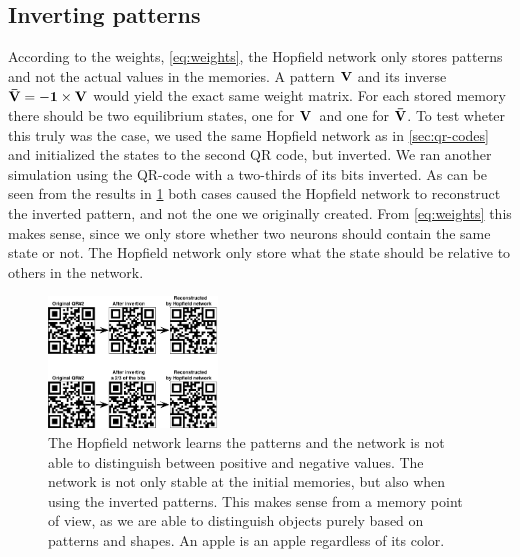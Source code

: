 \subsection{Inverting patterns}
According to the weights, \cref{eq:weights}, the Hopfield network only stores patterns and not the actual values in the memories. A pattern $\bf V$ and its inverse $\bf \bar{V} = -1 \times \bf V$ would yield the exact same weight matrix. For each stored memory there should be two equilibrium states, one for $\bf V$ and one for $\bf \bar{V}$. To test wheter this truly was the case, we used the same Hopfield network as in \cref{sec:qr-codes} and initialized the states to the second QR code, but inverted. We ran another simulation using the QR-code with a two-thirds of its bits inverted. As can be seen from the results in \cref{fig:inverted-qr} both cases caused the Hopfield network to reconstruct the inverted pattern, and not the one we originally created. From \cref{eq:weights} this makes sense, since we only store whether two neurons should contain the same state or not. The Hopfield network only store what the state should be relative to others in the network.
\begin{figure}[H]
    \centering
        \includegraphics[width=0.4\textwidth]{figs/qr-inverted}
        \caption{The Hopfield network learns the patterns and the network is not able to distinguish between positive and negative values. The network is not only stable at the initial memories, but also when using the inverted patterns. This makes sense from a memory point of view, as we are able to distinguish objects purely based on patterns and shapes. An apple is an apple regardless of its color.}
        \label{fig:inverted-qr}
\end{figure}